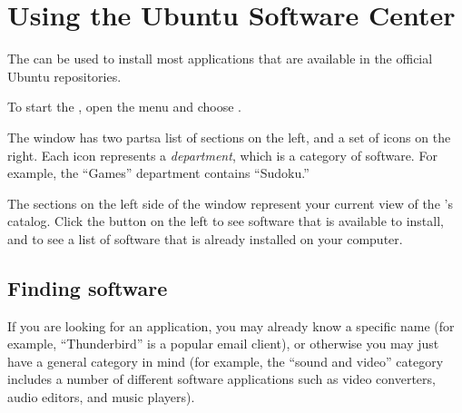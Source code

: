 
\section{Using the Ubuntu Software Center}
\label{sec:software-center}

The  can be used to install most applications that are available in the official Ubuntu repositories.

To start the , open the  menu and choose
.


The  window has two parts\dash a list of sections on the left,
and a set of icons on the right. Each icon represents a \emph{department},
which is a category of software.  For example, the ``Games'' department
contains ``Sudoku.''

The sections on the left side of the window represent your current view
of the 's catalog. Click the  button on the left to see software that is available to install, and  to
see a list of software that is already installed on your computer.

\subsection{Finding software}

If you are looking for an application, you may already know a specific name (for example, ``Thunderbird'' is a popular email client), or otherwise you may just have a general category in mind (for example, the ``sound and video'' category includes a number of different software applications such as video converters, audio editors, and music players).

